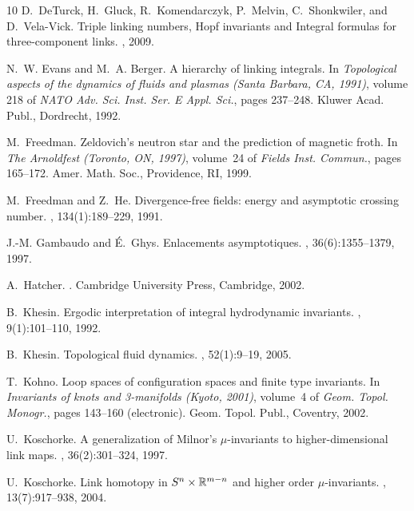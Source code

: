 \documentclass[12pt]{article}
\numberwithin{equation}{section}
\begin{document}
\begin{thebibliography}{10}
D.~DeTurck, H.~Gluck, R.~Komendarczyk, P.~Melvin, C.~Shonkwiler, and
  D.~Vela-Vick.
\newblock Triple linking numbers, {H}opf invariants and {I}ntegral formulas for
  three-component links.
, 2009.

N.~W. Evans and M.~A. Berger.
\newblock A hierarchy of linking integrals.
\newblock In {\em Topological aspects of the dynamics of fluids and plasmas
  (Santa Barbara, CA, 1991)}, volume 218 of {\em NATO Adv. Sci. Inst. Ser. E
  Appl. Sci.}, pages 237--248. Kluwer Acad. Publ., Dordrecht, 1992.

M.~Freedman.
\newblock Zeldovich's neutron star and the prediction of magnetic froth.
\newblock In {\em The Arnoldfest (Toronto, ON, 1997)}, volume~24 of {\em Fields
  Inst. Commun.}, pages 165--172. Amer. Math. Soc., Providence, RI, 1999.

M.~Freedman and Z.~He.
\newblock Divergence-free fields: energy and asymptotic crossing number.
, 134(1):189--229, 1991.

J.-M. Gambaudo and {\'E}.~Ghys.
\newblock Enlacements asymptotiques.
, 36(6):1355--1379, 1997.

A.~Hatcher.
.
\newblock Cambridge University Press, Cambridge, 2002.

B.~Khesin.
\newblock Ergodic interpretation of integral hydrodynamic invariants.
, 9(1):101--110, 1992.

B.~Khesin.
\newblock Topological fluid dynamics.
, 52(1):9--19, 2005.

T.~Kohno.
\newblock Loop spaces of configuration spaces and finite type invariants.
\newblock In {\em Invariants of knots and 3-manifolds (Kyoto, 2001)}, volume~4
  of {\em Geom. Topol. Monogr.}, pages 143--160 (electronic). Geom. Topol.
  Publ., Coventry, 2002.

U.~Koschorke.
\newblock A generalization of {M}ilnor's {$\mu$}-invariants to
  higher-dimensional link maps.
, 36(2):301--324, 1997.

U.~Koschorke.
\newblock Link homotopy in {$S\sp n\times \mathbb{R}\sp {m-n}$} and higher order
  {$\mu$}-invariants.
, 13(7):917--938, 2004.


\end{thebibliography}
\end{document}
